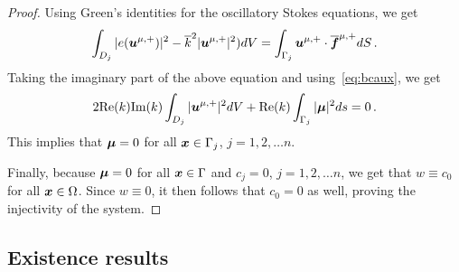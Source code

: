 \begin{proof}
Using Green's identities for the oscillatory Stokes equations, we get 
\begin{equation}
\int_{D_{j}} |e({\boldsymbol u}^{\mu,+})|^{2}  - \overline{k}^{2} |{\boldsymbol u}^{\mu,+}|^2) dV = 
\int_{\Gamma_{j}} {\boldsymbol u}^{\mu,+} \cdot \overline{{\boldsymbol f}}^{\mu,+} dS \, .
\end{equation}
Taking the imaginary part of the above equation and using~\cref{eq:bcaux}, 
we get
\begin{equation}
2 \text{Re}(k) \text{Im}(k) \int_{D_{j}} |{\boldsymbol u}^{\mu,+}|^2 dV 
+ \text{Re}(k) \int_{\Gamma_{j}} |{\boldsymbol \mu}|^2 ds = 0 \, .
\end{equation}
This implies that ${\boldsymbol \mu} =0$ for all ${\boldsymbol x} \in \Gamma_{j}$, $j=1,2,\ldots n$.

Finally, because ${\boldsymbol \mu} =0$ for all ${\boldsymbol x} \in \Gamma$ and 
$c_{j}= 0$, $j=1,2,\ldots n$, 
we get that $w \equiv c_{0}$ for all ${\boldsymbol x} \in \Omega$. 
Since $w\equiv 0$, it then follows that $c_{0} = 0$ as well, proving the 
injectivity of the system.

\end{proof}
\subsection{Existence results}

